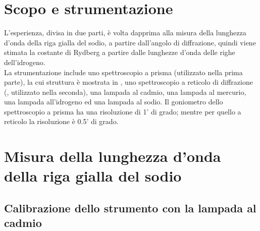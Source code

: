 \section{Scopo e strumentazione}

L'esperienza, divisa in due parti, è volta dapprima alla misura della lunghezza d'onda della riga gialla del sodio, a partire dall'angolo di diffrazione, quindi viene stimata la costante di Rydberg a partire dalle lunghezze d'onda delle righe dell'idrogeno.\\ La strumentazione include uno spettroscopio a prisma (utilizzato nella prima parte), la cui struttura è mostrata in , uno spettroscopio a reticolo di diffrazione (, utilizzato nella seconda), una lampada al cadmio, una lampada al mercurio, una lampada all'idrogeno ed una lampada al sodio. Il goniometro dello spettroscopio a prisma ha una risoluzione di 1' di grado; mentre per quello a reticolo la risoluzione è 0.5' di grado.



\section{Misura della lunghezza d'onda della riga gialla del sodio}

\subsection{Calibrazione dello strumento con la lampada al cadmio}

